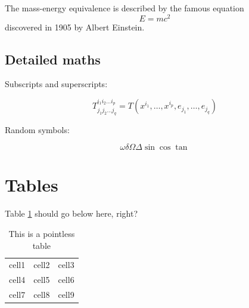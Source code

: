 \documentclass[12pt]{article}
\begin{document}
The mass-energy equivalence is described by the famous equation
\begin{equation}
    E=mc^2
\end{equation}
discovered in 1905 by Albert Einstein. 

\subsection{Detailed maths}

Subscripts and superscripts:

\[ T^{i_1 i_2 \dots i_p}_{j_1 j_2 \dots j_q} = T(x^{i_1},\dots,x^{i_p},e_{j_1},\dots,e_{j_q}) \]

Random symbols:

\[ \omega \delta \Omega \Delta \sin \cos \tan \]

\section{Tables}

Table \ref{table:data} should go below here, right?

\begin{table}[h!] %
    \centering
    \begin{tabular}{|c|c|c|} %
     \hline %
     cell1 & cell2 & cell3 \\ 
     cell4 & cell5 & cell6 \\ 
     cell7 & cell8 & cell9 \\ 
     \hline %
    \end{tabular}
    \caption{This is a pointless table}
    \label{table:data}
\end{table}
\end{document}
